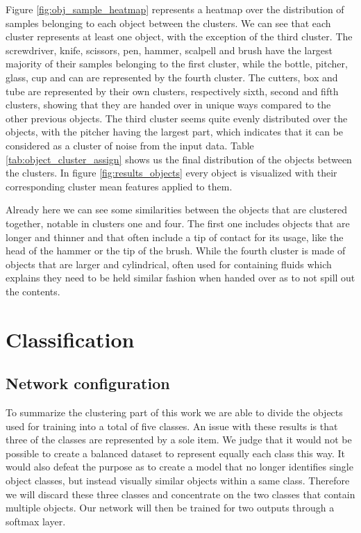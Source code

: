 Figure \ref{fig:obj_sample_heatmap} represents a heatmap over the distribution of samples belonging to each object between the clusters. We can see that each cluster represents at least one object, with the exception of the third cluster. The screwdriver, knife, scissors, pen, hammer, scalpell and brush have the largest majority of their samples belonging to the first cluster, while the bottle, pitcher, glass, cup and can are represented by the fourth cluster. The cutters, box and tube are represented by their own clusters, respectively sixth, second and fifth clusters, showing that they are handed over in unique ways compared to the other previous objects. The third cluster seems quite evenly distributed over the objects, with the pitcher having the largest part, which indicates that it can be considered as a cluster of noise from the input data. Table \ref{tab:object_cluster_assign} shows us the final distribution of the objects between the clusters. In figure \ref{fig:results_objects} every object is visualized with their corresponding cluster mean features applied to them.

Already here we can see some similarities between the objects that are clustered together, notable in clusters one and four. The first one includes objects that are longer and thinner and that often include a tip of contact for its usage, like the head of the hammer or the tip of the brush. While the fourth cluster is made of objects that are larger and cylindrical, often used for containing fluids which explains they need to be held similar fashion when handed over as to not spill out the contents.



%

\section{Classification}

\subsection{Network configuration}
\label{sec:res_setup}

To summarize the clustering part of this work we are able to divide the objects used for training into a total of five classes. An issue with these results is that three of the classes are represented by a sole item. We judge that it would not be possible to create a balanced dataset to represent equally each class this way. It would also defeat the purpose as to create a model that no longer identifies single object classes, but instead visually similar objects within a same class. Therefore we will discard these three classes and concentrate on the two classes that contain multiple objects. Our network will then be trained for two outputs through a softmax layer.

